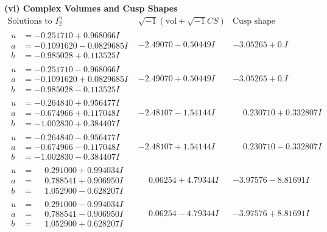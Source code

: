 \documentclass[1p]{elsarticle_modified}
\theoremstyle{definition}
\newcommand{\I}{\sqrt{-1}}
\begin{document}
\newpage\flushleft \textbf{(vi) Complex Volumes and Cusp Shapes}
$$\begin{array}{c|c|c}  
\text{Solutions to }I^u_{2}& \I (\text{vol} + \sqrt{-1}CS) & \text{Cusp shape}\\
 \hline 
\begin{aligned}
u &= -0.251710 + 0.968066 I \\
a &= -0.1091620 - 0.0829685 I \\
b &= -0.985028 + 0.113525 I\end{aligned}
 & -2.49070 - 0.50449 I & -3.05265 + 0. I\phantom{ +0.000000I} \\ \hline\begin{aligned}
u &= -0.251710 - 0.968066 I \\
a &= -0.1091620 + 0.0829685 I \\
b &= -0.985028 - 0.113525 I\end{aligned}
 & -2.49070 + 0.50449 I & -3.05265 + 0. I\phantom{ +0.000000I} \\ \hline\begin{aligned}
u &= -0.264840 + 0.956477 I \\
a &= -0.674966 + 0.117048 I \\
b &= -1.002830 + 0.384407 I\end{aligned}
 & -2.48107 - 1.54144 I & \phantom{-}0.230710 + 0.332807 I \\ \hline\begin{aligned}
u &= -0.264840 - 0.956477 I \\
a &= -0.674966 - 0.117048 I \\
b &= -1.002830 - 0.384407 I\end{aligned}
 & -2.48107 + 1.54144 I & \phantom{-}0.230710 - 0.332807 I \\ \hline\begin{aligned}
u &= \phantom{-}0.291000 + 0.994034 I \\
a &= \phantom{-}0.788541 + 0.906950 I \\
b &= \phantom{-}1.052900 - 0.628207 I\end{aligned}
 & \phantom{-}0.06254 + 4.79344 I & -3.97576 - 8.81691 I \\ \hline\begin{aligned}
u &= \phantom{-}0.291000 - 0.994034 I \\
a &= \phantom{-}0.788541 - 0.906950 I \\
b &= \phantom{-}1.052900 + 0.628207 I\end{aligned}
 & \phantom{-}0.06254 - 4.79344 I & -3.97576 + 8.81691 I \\ \hline\begin{aligned}

\end{aligned}
\end{array}$$
\end{document}
